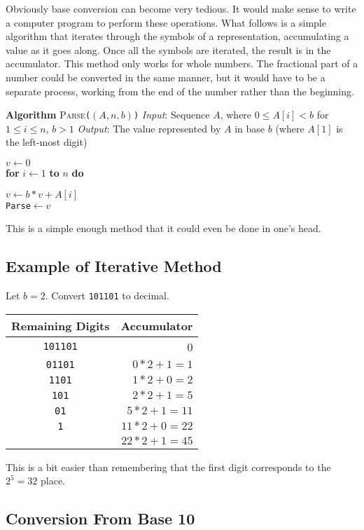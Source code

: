 \documentclass[12pt]{article}
\newcommand{\Lindent}{0.4in}
\newenvironment{Lalgorithm}[4]{
\textbf{Algorithm} \textsc{#1}\texttt{(#2)}\newline
\textit{Input}: #3\newline
\textit{Output}: #4\newline
}{}
\newcommand{\Lfor}[2]{\textbf{for} #1 \textbf{do}\\\hspace*{\Lindent}\parbox{\textwidth}{#2}}
\begin{document}
Obviously base conversion can become very tedious.  It would make sense to write a computer program to perform these operations.  What follows is a simple algorithm that iterates through the symbols of a representation, accumulating a value as it goes along.  Once all the symbols are iterated, the result is in the accumulator.  This method only works for whole numbers.  The fractional part of a number could be converted in the same manner, but it would have to be a separate process, working from the end of the number rather than the beginning.

\begin{Lalgorithm}
    {Parse}
    {$(A, n, b)$}
    {Sequence $A$, where $0 \leq A[i] < b$ for $1 \leq i \leq n$, $b > 1$}
    {The value represented by $A$ in base $b$ (where $A[1]$ is the left-most digit)}
$v \gets 0$\\
\Lfor{$i \gets 1$ \textbf{to} $n$}{
$v \gets b * v + A[i]$\\
\texttt{Parse}$\gets v$}
\end{Lalgorithm}

\noindent This is a simple enough method that it could even be done in one's head.

\subsection*{Example of Iterative Method}

Let $b = 2$.  Convert \verb!101101! to decimal.

\begin{tabular}{|c|r|}
Remaining Digits&Accumulator\\
\hline
\texttt{101101}&0 \\
\texttt{01101}&$0*2 + 1 = 1$\\
\texttt{1101}&$1*2 + 0 = 2$\\
\texttt{101}&$2*2+1 = 5$\\
\texttt{01}&$5*2+1 = 11$\\
\texttt{1}&$11*2+0 = 22$\\
&$22*2+1 = 45$
\end{tabular}

This is a bit easier than remembering that the first digit corresponds to the
$2^5 = 32$ place.

\subsection*{Conversion From Base 10}
\end{document}
